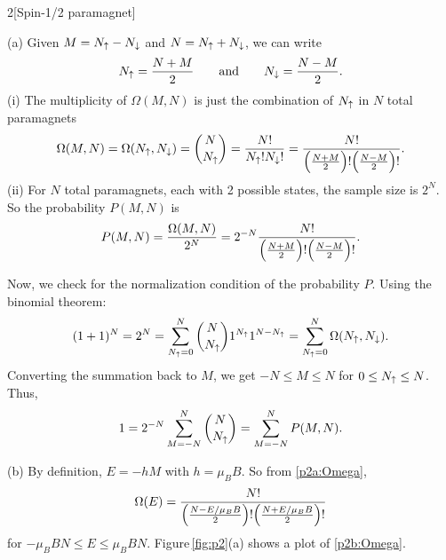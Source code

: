 \documentclass[12pt]{article}
\begin{document}
\begin{problem}{2}[Spin-1/2 paramagnet]
\begin{solution}
(a) Given $M=N_\uparrow-N_\downarrow$ and $N=N_\uparrow+N_\downarrow$, we can write
\begin{equation}
    N_\uparrow=\frac{N+M}{2}\qquad\text{and}\qquad
    N_\downarrow=\frac{N-M}{2}.
\end{equation}
(i) The multiplicity of $\Omega(M,N)$ is just the combination of $N_\uparrow$ in $N$
total paramagnets
\begin{equation}\label{p2a:Omega}
    \Omega(M,N)=\Omega(N_\uparrow,N_\downarrow)
    =\binom{N}{N_\uparrow}
    =\frac{N!}{N_\uparrow!N_\downarrow!}
    =\frac{N!}{\qty(\frac{N+M}{2})!\qty(\frac{N-M}{2})!}.
\end{equation}
(ii) For $N$ total paramagnets, each with 2 possible states, the sample size is
$2^N$. So the probability $P(M,N)$ is
\begin{equation}
    P(M,N)=\frac{\Omega(M,N)}{2^N}
    =2^{-N}\frac{N!}{\qty(\frac{N+M}{2})!\qty(\frac{N-M}{2})!}.
\end{equation}

Now, we check for the normalization condition of the probability $P$. Using the
binomial theorem:
\begin{equation}
    (1+1)^N=2^N=\sum_{N_\uparrow=0}^N\binom{N}{N_\uparrow}1^{N_\uparrow}1^{N-N_\uparrow}
    =\sum_{N_\uparrow=0}^N\Omega(N_\uparrow,N_\downarrow).
\end{equation}
Converting the summation back to $M$, we get $-N\leq M\leq N$ for $0\leq
N_\uparrow\leq N$. Thus,
\begin{equation}
    1=2^{-N}\sum_{M=-N}^N\binom{N}{N_\uparrow}=\sum_{M=-N}^NP(M,N). 
\end{equation}

(b) By definition, $E=-hM$ with $h=\mu_BB$. So from \eqref{p2a:Omega},
\begin{equation}\label{p2b:Omega}
    \Omega(E)=\frac{N!}{\qty(\frac{N-E/\mu_BB}{2})!\qty(\frac{N+E/\mu_BB}{2})!}
\end{equation}
for $-\mu_BBN\leq E\leq\mu_BBN$. Figure\,\ref{fig:p2}(a) shows a plot of
\eqref{p2b:Omega}.


\end{solution}
\end{problem}
\end{document}
